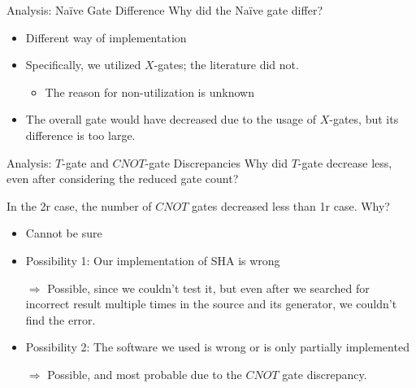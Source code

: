 \documentclass{beamer}
\begin{document}
    \begin{frame}{Analysis: Na\"ive Gate Difference}
    	Why did the Na\"ive gate differ?
    	\begin{itemize}
    		\item Different way of implementation
    		\item Specifically, we utilized $X$-gates; the literature did not.
    		\begin{itemize}
    			\item The reason for non-utilization is unknown
    		\end{itemize}
    		\item The overall gate would have decreased due to the usage of $X$-gates, but its difference is too large.
    	\end{itemize}
    \end{frame}
  	
  	\begin{frame}{Analysis: $T$-gate and $CNOT$-gate Discrepancies}
  		Why did $T$-gate decrease less, even after considering the reduced gate count?
  		
  		In the 2r case, the number of $CNOT$ gates decreased less than 1r case. Why?
  		\begin{itemize}
  			\item Cannot be sure
  			\item Possibility 1: Our implementation of SHA is wrong
  			\item[$\Rightarrow$] Possible, since we couldn't test it, but even after we searched for incorrect result multiple times in the source and its generator, we couldn't find the error.
  			\item Possibility 2: The software we used is wrong or is only partially implemented
  			\item[$\Rightarrow$] Possible, and most probable due to the $CNOT$ gate discrepancy.
  		\end{itemize}
  	\end{frame}
\end{document}
